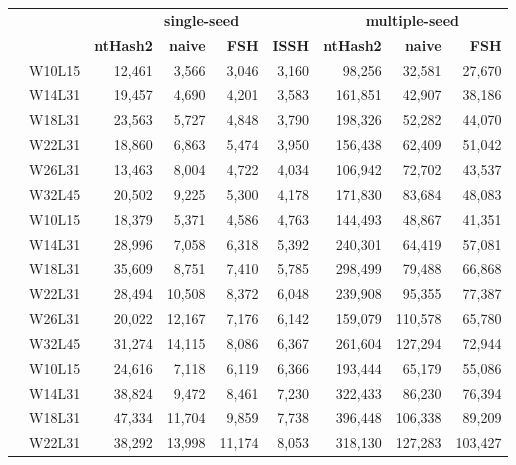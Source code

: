 \section*{\phantom{A}}
\begin{table}[!ht]
	\raggedleft
	\begin{tabular}{c r | rrrr | rrr}
		& & \multicolumn{4}{|c}{\textbf{single-seed}} & \multicolumn{3}{|c}{\textbf{multiple-seed}} \\
		& & \textbf{ntHash2} & \textbf{naive} & \textbf{FSH} & \textbf{ISSH} & \textbf{ntHash2} &  \textbf{naive} & \textbf{FSH} \\
		\toprule
		\multirow{6}{*}{\rotatebox[origin=c]{90}{\textbf{R1000}}}
		& W10L15 & 12,461 & 3,566 & 3,046 & 3,160 & 98,256 & 32,581 & 27,670 \\
		& W14L31 & 19,457 & 4,690 & 4,201 & 3,583 & 161,851 & 42,907 & 38,186 \\
		& W18L31 & 23,563 & 5,727 & 4,848 & 3,790 & 198,326 & 52,282 & 44,070 \\
		& W22L31 & 18,860 & 6,863 & 5,474 & 3,950 & 156,438 & 62,409 & 51,042 \\
		& W26L31 & 13,463 & 8,004 & 4,722 & 4,034 & 106,942 & 72,702 & 43,537 \\
		& W32L45 & 20,502 & 9,225 & 5,300 & 4,178 & 171,830 & 83,684 & 48,083 \\
		\midrule
		\multirow{6}{*}{\rotatebox[origin=c]{90}{\textbf{R1500}}}
		& W10L15 & 18,379 & 5,371 & 4,586 & 4,763 & 144,493 & 48,867 & 41,351 \\
		& W14L31 & 28,996 & 7,058 & 6,318 & 5,392 & 240,301 & 64,419 & 57,081 \\
		& W18L31 & 35,609 & 8,751 & 7,410 & 5,785 & 298,499 & 79,488 & 66,868 \\
		& W22L31 & 28,494 & 10,508 & 8,372 & 6,048 & 239,908 & 95,355 & 77,387 \\
		& W26L31 & 20,022 & 12,167 & 7,176 & 6,142 & 159,079 & 110,578 & 65,780 \\
		& W32L45 & 31,274 & 14,115 & 8,086 & 6,367 & 261,604 & 127,294 & 72,944 \\
		\midrule
		\multirow{6}{*}{\rotatebox[origin=c]{90}{\textbf{R2000}}}
		& W10L15 & 24,616 & 7,118 & 6,119 & 6,366 & 193,444 & 65,179 & 55,086 \\
		& W14L31 & 38,824 & 9,472 & 8,461 & 7,230 & 322,433 & 86,230 & 76,394 \\
		& W18L31 & 47,334 & 11,704 & 9,859 & 7,738 & 396,448 & 106,338 & 89,209 \\
		& W22L31 & 38,292 & 13,998 & 11,174 & 8,053 & 318,130 & 127,283 & 103,427 \\

\end{tabular}
\end{table}

